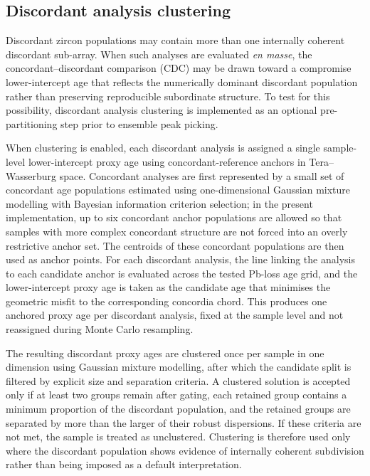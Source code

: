 \subsection{Discordant analysis clustering}\label{sec:disc-analysis-cluster}

Discordant zircon populations may contain more than one internally coherent discordant sub-array. When such analyses are evaluated \textit{en masse}, the concordant--discordant comparison (CDC) may be drawn toward a compromise lower-intercept age that reflects the numerically dominant discordant population rather than preserving reproducible subordinate structure. To test for this possibility, discordant analysis clustering is implemented as an optional pre-partitioning step prior to ensemble peak picking.

When clustering is enabled, each discordant analysis is assigned a single sample-level lower-intercept proxy age using concordant-reference anchors in Tera--Wasserburg space. Concordant analyses are first represented by a small set of concordant age populations estimated using one-dimensional Gaussian mixture modelling with Bayesian information criterion selection; in the present implementation, up to six concordant anchor populations are allowed so that samples with more complex concordant structure are not forced into an overly restrictive anchor set. The centroids of these concordant populations are then used as anchor points. For each discordant analysis, the line linking the analysis to each candidate anchor is evaluated across the tested Pb-loss age grid, and the lower-intercept proxy age is taken as the candidate age that minimises the geometric misfit to the corresponding concordia chord. This produces one anchored proxy age per discordant analysis, fixed at the sample level and not reassigned during Monte Carlo resampling.

The resulting discordant proxy ages are clustered once per sample in one dimension using Gaussian mixture modelling, after which the candidate split is filtered by explicit size and separation criteria. A clustered solution is accepted only if at least two groups remain after gating, each retained group contains a minimum proportion of the discordant population, and the retained groups are separated by more than the larger of their robust dispersions. If these criteria are not met, the sample is treated as unclustered. Clustering is therefore used only where the discordant population shows evidence of internally coherent subdivision rather than being imposed as a default interpretation.

